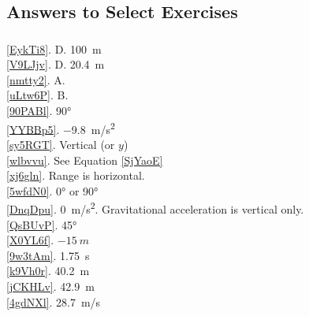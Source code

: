 \documentclass[main-physics.tex]{subfiles}
\begin{document}
\subsection{Answers to Select Exercises}
\begin{multicols}{2}
\subsubsection*{}
\ref{EykTi8}. D. \SI{100}{m}\\
\ref{V9LJjv}. D. \SI{20.4}{m}\\
\ref{nmtty2}. A. \\
\ref{uLtw6P}. B.\\
\ref{90PABl}. \ang{90}\\
\ref{YYBBp5}. \SI{-9.8}{m/s^2}\\
\ref{sy5RGT}. Vertical (or $y$)\\
\ref{wlbvvu}. See Equation \eqref{SjYaoE}\\
\ref{xj6gln}. Range is horizontal.\\
\ref{5wfdN0}. \ang{0} or \ang{90}\\
\ref{DnqDpu}. \SI{0}{m/s^2}. Gravitational acceleration is vertical only.\\
\ref{QsBUvP}. \ang{45}\\
\ref{X0YL6f}. $-\SI{15}{m}$\\
\ref{9w3tAm}. \SI{1.75}{s}\\
\ref{k9Vh0r}. \SI{40.2}{m}\\
\ref{jCKHLv}. \SI{42.9}{m}\\
\ref{4gdNXl}. \SI{28.7}{m/s}


\end{multicols}
\end{document}
